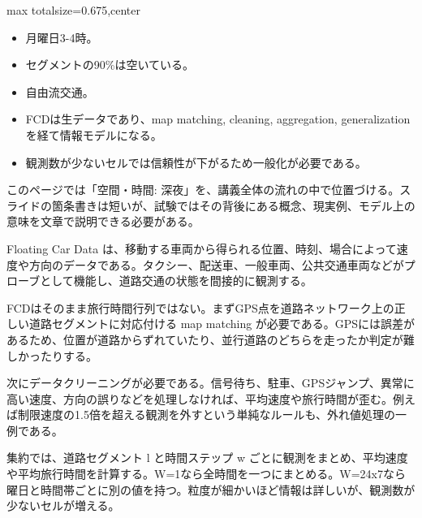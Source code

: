 \clearpage
{}
\begin{adjustbox}{max totalsize={\textwidth}{0.675\textheight},center}
\begin{minipage}{\textwidth}\scriptsize
\begin{minipage}[t]{0.485\textwidth}
\begin{itemize}
\item 月曜日3-4時。
\item セグメントの90\%は空いている。
\item 自由流交通。
\end{itemize}
\begin{itemize}
\item FCDは生データであり、map matching, cleaning, aggregation, generalization を経て情報モデルになる。
\item 観測数が少ないセルでは信頼性が下がるため一般化が必要である。
\end{itemize}
\end{minipage}\hfill
\begin{minipage}[t]{0.485\textwidth}
このページでは「空間・時間: 深夜」を、講義全体の流れの中で位置づける。スライドの箇条書きは短いが、試験ではその背後にある概念、現実例、モデル上の意味を文章で説明できる必要がある。\par
Floating Car Data は、移動する車両から得られる位置、時刻、場合によって速度や方向のデータである。タクシー、配送車、一般車両、公共交通車両などがプローブとして機能し、道路交通の状態を間接的に観測する。\par
FCDはそのまま旅行時間行列ではない。まずGPS点を道路ネットワーク上の正しい道路セグメントに対応付ける map matching が必要である。GPSには誤差があるため、位置が道路からずれていたり、並行道路のどちらを走ったか判定が難しかったりする。\par
次にデータクリーニングが必要である。信号待ち、駐車、GPSジャンプ、異常に高い速度、方向の誤りなどを処理しなければ、平均速度や旅行時間が歪む。例えば制限速度の1.5倍を超える観測を外すという単純なルールも、外れ値処理の一例である。\par
集約では、道路セグメント l と時間ステップ w ごとに観測をまとめ、平均速度や平均旅行時間を計算する。W=1なら全時間を一つにまとめる。W=24x7なら曜日と時間帯ごとに別の値を持つ。粒度が細かいほど情報は詳しいが、観測数が少ないセルが増える。\par

\end{minipage}
\end{minipage}
\end{adjustbox}
